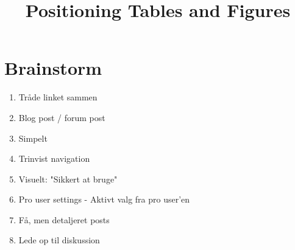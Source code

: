 \documentclass[11pt]{article}
\title{Positioning Tables and Figures}
\begin{document}
\section{Brainstorm}
\begin{enumerate}
\item Tråde linket sammen
\item Blog post / forum post
\item Simpelt
\item Trinvist navigation
\item Visuelt: "Sikkert at bruge"
\item Pro user settings - Aktivt valg fra pro user'en
\item Få, men detaljeret posts
\item Lede op til diskussion
\end{enumerate}
\end{document}
